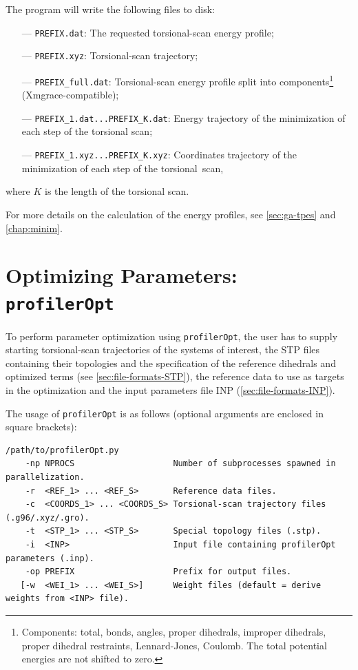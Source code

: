 \documentclass[10pt,a4paper,openany]{memoir}
\numberwithin{equation}{section}
\newcommand{\profileropt}[0]{\texttt{profilerOpt}}
\begin{document}
\noindent The program will write the following files to disk:
\begin{itemize}
\item[---] \texttt{PREFIX.dat}: The requested torsional-scan energy profile;
\item[---] \texttt{PREFIX.xyz}: Torsional-scan trajectory;
\item[---] \texttt{PREFIX\_full.dat}: Torsional-scan energy profile split into components\footnote{Components: total, bonds, angles, proper dihedrals, improper dihedrals, proper dihedral restraints, Lennard-Jones, Coulomb. The total potential energies are not shifted to zero.} (Xmgrace-compatible);
\item[---] \texttt{PREFIX\_1.dat...PREFIX\_K.dat}: Energy trajectory of the minimization of each step of the torsional scan;
\item[---] \texttt{PREFIX\_1.xyz...PREFIX\_K.xyz}: Coordinates trajectory of the minimization of each step of the torsional~scan,
\end{itemize}
where $K$ is the length of the torsional scan.

For more details on the calculation of the energy profiles, see \autoref{sec:ga-tpes} and \autoref{chap:minim}.

\section{Optimizing Parameters: \profileropt{}}
\label{sec:program-opt}

To perform parameter optimization using \profileropt{}, the user has
to supply starting torsional-scan trajectories of the systems of
interest, the STP files containing their topologies and the
specification of the reference dihedrals and optimized terms (see
\autoref{sec:file-formats-STP}), the reference data to use as targets
in the optimization and the input parameters file INP
(\autoref{sec:file-formats-INP}).

The usage of \profileropt{} is as follows (optional arguments are
enclosed in square brackets):

\begin{lstlisting}
/path/to/profilerOpt.py
    -np NPROCS                    Number of subprocesses spawned in parallelization.
    -r  <REF_1> ... <REF_S>       Reference data files.
    -c  <COORDS_1> ... <COORDS_S> Torsional-scan trajectory files (.g96/.xyz/.gro).
    -t  <STP_1> ... <STP_S>       Special topology files (.stp).
    -i  <INP>                     Input file containing profilerOpt parameters (.inp).
    -op PREFIX                    Prefix for output files.
   [-w  <WEI_1> ... <WEI_S>]      Weight files (default = derive weights from <INP> file).
\end{lstlisting}\vspace{1ex}
\end{document}
